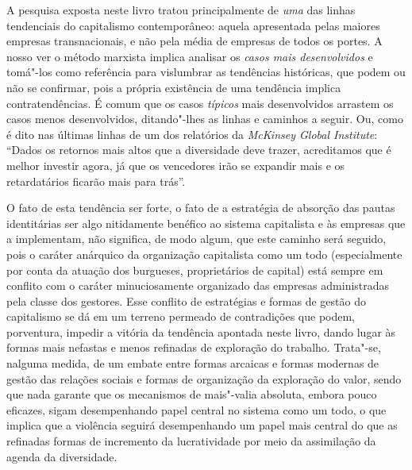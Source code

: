A pesquisa exposta neste livro tratou principalmente de \emph{uma} das
linhas tendenciais do capitalismo contemporâneo: aquela apresentada
pelas maiores empresas transnacionais, e não pela média de empresas de
todos os portes. A nosso ver o método marxista implica analisar os
\emph{casos mais desenvolvidos} e tomá"-los como referência para
vislumbrar as tendências históricas, que podem ou não se confirmar, pois
a própria existência de uma tendência implica contratendências. É comum
que os casos \emph{típicos} mais desenvolvidos arrastem os casos menos
desenvolvidos, ditando"-lhes as linhas e caminhos a seguir. Ou, como é
dito nas últimas linhas de um dos relatórios da \emph{McKinsey Global
Institute}: ``Dados os retornos mais altos que a diversidade deve
trazer, acreditamos que é melhor investir agora, já que os vencedores
irão se expandir mais e os retardatários ficarão mais para trás''.

O fato de esta tendência ser forte, o fato de a estratégia de absorção
das pautas identitárias ser algo nitidamente benéfico ao sistema
capitalista e às empresas que a implementam, não significa, de modo
algum, que este caminho será seguido, pois o caráter anárquico da
organização capitalista como um todo (especialmente por conta da atuação
dos burgueses, proprietários de capital) está sempre em conflito com o
caráter minuciosamente organizado das empresas administradas pela classe
dos gestores. Esse conflito de estratégias e formas de gestão do
capitalismo se dá em um terreno permeado de contradições que podem,
porventura, impedir a vitória da tendência apontada neste livro, dando
lugar às formas mais nefastas e menos refinadas de exploração do
trabalho. Trata"-se, nalguma medida, de um embate entre formas arcaicas e
formas modernas de gestão das relações sociais e formas de organização
da exploração do valor, sendo que nada garante que os mecanismos de
mais"-valia absoluta, embora pouco eficazes, sigam desempenhando papel
central no sistema como um todo, o que implica que a violência seguirá
desempenhando um papel mais central do que as refinadas formas de
incremento da lucratividade por meio da assimilação da agenda da
diversidade.

